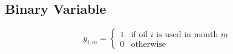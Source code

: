 \documentclass{article}
\begin{document}
\subsection*{Binary Variable}
\[
y_{i,m} = 
\begin{cases} 
1 & \text{if oil } i \text{ is used in month } m \\
0 & \text{otherwise}
\end{cases}
\]
\end{document}
